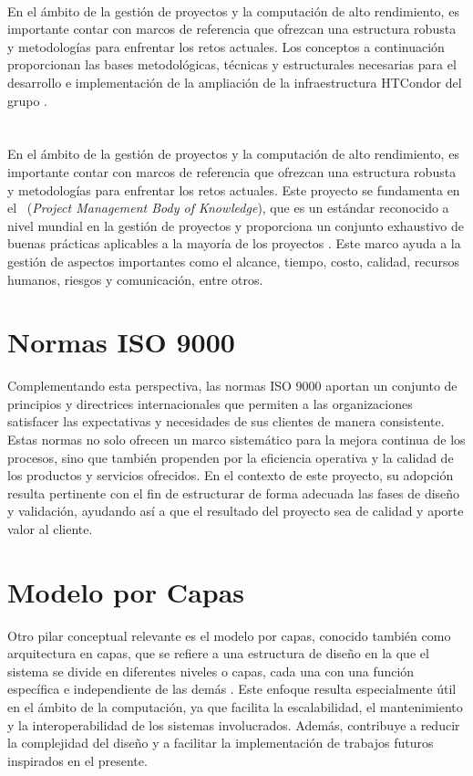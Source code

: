 \label{cap:marcoTeorico}
\mbox{}\\
En el ámbito de la gestión de proyectos y la computación de alto rendimiento, es importante contar con marcos de referencia que ofrezcan una estructura robusta y metodologías para enfrentar los retos actuales. Los conceptos a continuación proporcionan las bases metodológicas, técnicas y estructurales necesarias para el desarrollo e implementación de la ampliación de la infraestructura HTCondor del grupo \GRID.

\section{\PMBOK}
En el ámbito de la gestión de proyectos y la computación de alto rendimiento, es importante contar con marcos de referencia que ofrezcan una estructura robusta y metodologías para enfrentar los retos actuales. Este proyecto se fundamenta en el \PMBOK~(\textit{Project Management Body of Knowledge}), que es un estándar reconocido a nivel mundial en la gestión de proyectos y proporciona un conjunto exhaustivo de buenas prácticas aplicables a la mayoría de los proyectos \citep{PMI2019}. Este marco ayuda a la gestión de aspectos importantes como el alcance, tiempo, costo, calidad, recursos humanos, riesgos y comunicación, entre otros.

\section{Normas ISO 9000}
Complementando esta perspectiva, las normas ISO 9000 aportan un conjunto de principios y directrices internacionales que permiten a las organizaciones satisfacer las expectativas y necesidades de sus clientes de manera consistente. Estas normas no solo ofrecen un marco sistemático para la mejora continua de los procesos, sino que también propenden por la eficiencia operativa y la calidad de los productos y servicios ofrecidos. En el contexto de este proyecto, su adopción resulta pertinente con el fin de estructurar de forma adecuada las fases de diseño y validación, ayudando así a que el resultado del proyecto sea de calidad y aporte valor al cliente.

\section{Modelo por Capas}
Otro pilar conceptual relevante es el modelo por capas, conocido también como arquitectura en capas, que se refiere a una estructura de diseño en la que el sistema se divide en diferentes niveles o capas, cada una con una función específica e independiente de las demás \citep{Spray2023}. Este enfoque resulta especialmente útil en el ámbito de la computación, ya que facilita la escalabilidad, el mantenimiento y la interoperabilidad de los sistemas involucrados. Además, contribuye a reducir la complejidad del diseño y a facilitar la implementación de trabajos futuros inspirados en el presente.

